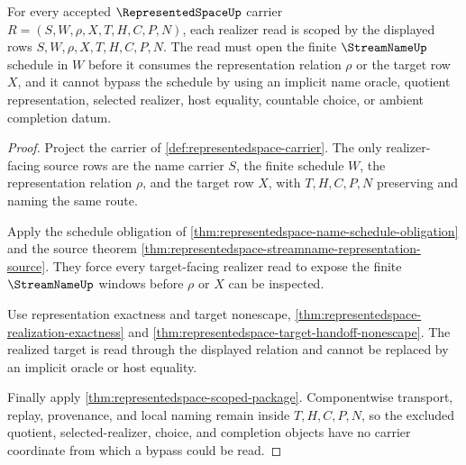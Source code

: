 \begin{theorem}
\label{thm:represented-space-realizer-scope}
For every accepted $\RepresentedSpaceUp$ carrier $R=(S,W,\rho,X,T,H,C,P,N)$, each realizer read is scoped by the displayed rows $S,W,\rho,X,T,H,C,P,N$. The read must open the finite $\StreamNameUp$ schedule in $W$ before it consumes the representation relation $\rho$ or the target row $X$, and it cannot bypass the schedule by using an implicit name oracle, quotient representation, selected realizer, host equality, countable choice, or ambient completion datum.
\end{theorem}
\begin{proof}
Project the carrier of \autoref{def:representedspace-carrier}. The only realizer-facing source rows are the name carrier $S$, the finite schedule $W$, the representation relation $\rho$, and the target row $X$, with $T,H,C,P,N$ preserving and naming the same route.

Apply the schedule obligation of \autoref{thm:representedspace-name-schedule-obligation} and the source theorem \autoref{thm:representedspace-streamname-representation-source}. They force every target-facing realizer read to expose the finite $\StreamNameUp$ windows before $\rho$ or $X$ can be inspected.

Use representation exactness and target nonescape, \autoref{thm:representedspace-realization-exactness} and \autoref{thm:representedspace-target-handoff-nonescape}. The realized target is read through the displayed relation and cannot be replaced by an implicit oracle or host equality.

Finally apply \autoref{thm:representedspace-scoped-package}. Componentwise transport, replay, provenance, and local naming remain inside $T,H,C,P,N$, so the excluded quotient, selected-realizer, choice, and completion objects have no carrier coordinate from which a bypass could be read.
\end{proof}

